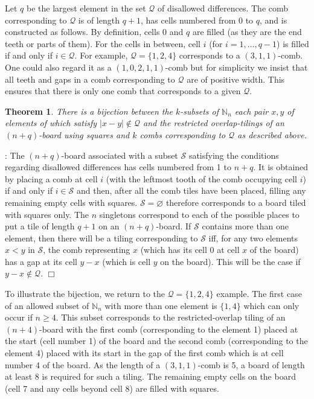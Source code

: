 \documentclass[preprint,3p]{elsarticle}
\newtheorem{thm}{Theorem}
\newcommand{\abs}[1]{\left\lvert#1\right\rvert}
\providecommand{\Nset}{\mathbb{N}}
\newenvironment{proof}[1][]%
{\noindent\textit{\ifthenelse{\equal{#1}{}}{Proof}{Proof #1}}: }%
{\leavevmode\unskip\nobreak\quad\hspace*{\fill}$\Box$\par}
\begin{document}
Let $q$ be the largest element in the set $\mathcal{Q}$ of disallowed
differences.  The comb corresponding to $\mathcal{Q}$ is of length
$q+1$, has cells numbered from 0 to $q$, and is constructed as
follows. By definition, cells 0
and $q$ are filled (as they are the end teeth or parts of
them). For the cells in between, cell $i$ (for $i=1,\ldots,q-1$) is
filled if and only if $i\in\mathcal{Q}$.  For example,
$\mathcal{Q}=\{1,2,4\}$ corresponds to a $(3,1,1)$-comb. One could
also regard it as a $(1,0,2,1,1)$-comb but for simplicity we insist
that all teeth and gaps in a comb corresponding to $\mathcal{Q}$ are
of positive width.  This ensures that there is only one comb that
corresponds to a given $\mathcal{Q}$.

\begin{thm}\label{T:bij}
There is a bijection between the $k$-subsets of $\Nset_n$ each pair
$x,y$ of elements of which satisfy $\abs{x-y}\notin\mathcal{Q}$ and
the restricted overlap-tilings of an $(n+q)$-board using squares and
$k$ combs corresponding to $\mathcal{Q}$ as described above.  
\end{thm}
\begin{proof}
The $(n+q)$-board associated with a subset $\mathcal{S}$ satisfying
the conditions regarding disallowed differences has cells numbered
from 1 to $n+q$. It is obtained by placing a comb at cell $i$
(with the leftmost tooth of the comb occupying cell $i$)
if and
only if $i\in\mathcal{S}$ and then, after all the comb tiles have been
placed, filling any remaining empty cells with squares.
$\mathcal{S}=\varnothing$ therefore corresponds to a board tiled with
squares only. The $n$ singletons correspond to each of the possible
places to put a tile of length $q+1$ on an $(n+q)$-board. If
$\mathcal{S}$ contains more than one element, then there will be a
tiling corresponding to $\mathcal{S}$ iff, for any two elements $x<y$
in $\mathcal{S}$, the comb representing $x$ (which has its cell 0 at
cell $x$ of the board) has a gap at its cell $y-x$ (which is cell $y$
on the board). This will be the case if $y-x\notin\mathcal{Q}$.
\end{proof}

To illustrate the bijection, we return to the $\mathcal{Q}=\{1,2,4\}$
example. The first case of an allowed subset of $\Nset_n$ with more
than one element is $\{1,4\}$ which can only occur if $n\geq4$. This
subset corresponds to the restricted-overlap tiling of an
$(n+4)$-board with the first comb (corresponding to the element 1)
placed at the start (cell number 1) of the board and the second comb
(corresponding to the element 4) placed with its start in the gap of
the first comb which is at cell number 4 of the board. As the
length of a $(3,1,1)$-comb is 5, a board of length at
least 8 is required for such a tiling. The remaining empty cells on
the board (cell 7 and any cells beyond cell 8) are filled with squares.
\end{document}
